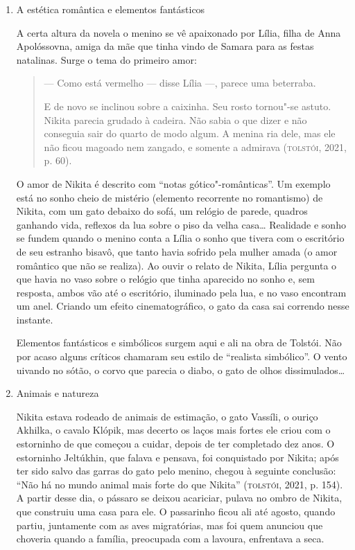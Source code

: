 \documentclass[11pt]{extarticle}
\begin{document}
\begin{enumerate}
\item
A estética romântica e elementos fantásticos

A certa altura da novela o menino se vê apaixonado por Lília, filha de
Anna Apolóssovna, amiga da mãe que tinha vindo de Samara para as festas
natalinas. Surge o tema do primeiro amor:

\begin{quote}
--- Como está vermelho --- disse Lília ---, parece uma beterraba.

E de novo se inclinou sobre a caixinha. Seu rosto tornou"-se astuto.
Nikita parecia grudado à cadeira. Não sabia o que dizer e não conseguia
sair do quarto de modo algum. A menina ria dele, mas ele não ficou
magoado nem zangado, e somente a admirava (\textsc{tolstói}, 2021, p. 60).
\end{quote}

O amor de Nikita é descrito com ``notas gótico"-românticas''. Um
exemplo está no sonho cheio de mistério (elemento recorrente no
romantismo) de Nikita, com um gato debaixo do sofá, um relógio de
parede, quadros ganhando vida, reflexos da lua sobre o piso da velha
casa\ldots{} Realidade e sonho se fundem quando o menino conta a Lília o
sonho que tivera com o escritório de seu estranho bisavô, que tanto
havia sofrido pela mulher amada (o amor romântico que não se realiza).
Ao ouvir o relato de Nikita, Lília pergunta o que havia no vaso sobre o
relógio que tinha aparecido no sonho e, sem resposta, ambos vão até o
escritório, iluminado pela lua, e no vaso encontram um anel. Criando um
efeito cinematográfico, o gato da casa sai correndo nesse instante.

Elementos fantásticos e simbólicos surgem aqui e ali na obra de
Tolstói. Não por acaso alguns críticos chamaram seu estilo de ``realista
simbólico''. O vento uivando no sótão, o corvo que parecia o diabo, o
gato de olhos dissimulados\ldots{}


\item
Animais e natureza

Nikita estava rodeado de animais de estimação, o gato Vassíli, o
ouriço Akhilka, o cavalo Klópik, mas decerto os laços mais fortes ele
criou com o estorninho de que começou a cuidar, depois de ter completado
dez anos. O estorninho Jeltúkhin, que falava e pensava, foi conquistado
por Nikita; após ter sido salvo das garras do gato pelo menino, chegou à
seguinte conclusão: ``Não há no mundo animal mais forte do que Nikita''
(\textsc{tolstói}, 2021, p. 154). A partir desse dia, o pássaro se deixou
acariciar, pulava no ombro de Nikita, que construiu uma casa para ele. O
passarinho ficou ali até agosto, quando partiu, juntamente com as aves
migratórias, mas foi quem anunciou que choveria
quando a família, preocupada com a lavoura, enfrentava a seca.


\end{enumerate}
\end{document}
